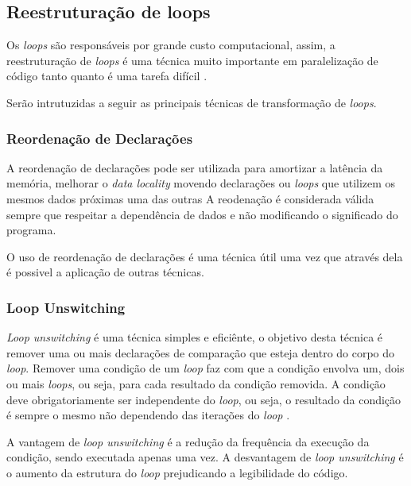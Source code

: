 \documentclass[12pt]{article}
\begin{document}
\subsection{Reestruturação de loops}

Os \textit{loops} são responsáveis por grande custo computacional, assim, a 
reestruturação de \textit{loops} é uma técnica muito importante em paralelização 
de código tanto quanto é uma tarefa difícil \cite{Huang2000259}.

Serão intrutuzidas a seguir as principais técnicas de transformação de 
\textit{loops}.

\subsubsection{Reordenação de Declarações}

A reordenação de declarações pode ser utilizada para amortizar a latência da 
memória, melhorar o \textit{data locality} movendo declarações ou \textit{loops}
que utilizem os mesmos dados próximas uma das outras \cite{McKinley:1996}
A reodenação é considerada válida sempre que respeitar a dependência de dados e 
não modificando o significado do programa.

O uso de reordenação de declarações é uma técnica útil uma vez que através dela 
é possivel a aplicação de outras técnicas.

\subsubsection{Loop Unswitching}

\textit{Loop unswitching} é uma técnica simples e eficiênte, o objetivo desta 
técnica é remover uma ou mais declarações de comparação que esteja dentro do
corpo do \textit{loop}.
Remover uma condição de um \textit{loop} faz com que a condição envolva um, dois
ou mais \textit{loops}, ou seja, para cada resultado da condição removida.
A condição deve obrigatoriamente ser independente do \textit{loop}, ou seja, o
resultado da condição é sempre o mesmo não dependendo das iterações do 
\textit{loop} \cite{Ghodrat:2008}.

A vantagem de \textit{loop unswitching} é a redução da frequência da execução
da condição, sendo executada apenas uma vez.
A desvantagem de \textit{loop unswitching} é o aumento da estrutura do
\textit{loop} prejudicando a legibilidade do código.
\end{document}
